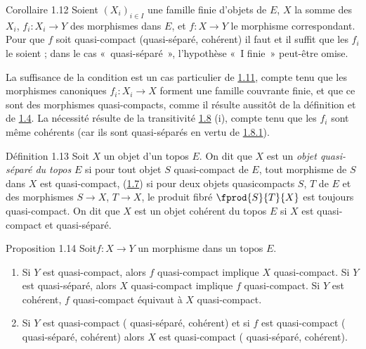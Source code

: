 \begin{enonce*}{Corollaire 1.12}
Soient $(X_i)_{i \in I}$ une famille finie d'objets de $E$, $X$ la
somme des $X_i$, $f_i : X_i \to Y$ des morphismes dans $E$, et $f : X
\to Y$ le morphisme correspondant. Pour que $f$ soit quasi-compact
(\resp quasi-séparé, \resp cohérent) il faut et il suffit que les
$f_i$ le soient ; dans le cas « quasi-séparé », l'hypothèse « I
finie » peut-être omise.
\end{enonce*}

La suffisance de la condition est un cas particulier de \hyperref[VI.cor1.11]{1.11}, compte
tenu que les morphismes canoniques $f_i : X_i \to X$ forment une
famille couvrante finie, et que ce sont des morphismes quasi-compacts,
comme il résulte aussitôt de la définition et de \hyperref[VI.cor1.4]{1.4}. La nécessité
résulte de la transitivité \hyperref[VI.prop1.8]{1.8} (i), compte tenu que les $f_i$ sont
même cohérents (car ils sont quasi-séparés en vertu de \hyperref[VI.cor1.8.1]{1.8.1}).

\begin{enonce*}{Définition 1.13}
Soit $X$ un objet d'un topos $E$. On dit que $X$ est un \emph{objet
quasi-séparé du topos} $E$ si pour tout objet $S$ quasi-compact
de $E$, tout morphisme de $S$ dans $X$ est quasi-compact, \ie (\hyperref[VI.def1.7]{1.7}) si
pour deux objets quasicompacts $S$, $T$ de $E$ et des morphismes $S
\to X$, $T \to X$, le produit fibré $\fprod{S}{T}{X}$ est toujours
quasi-compact. On dit que $X$ est un objet cohérent du topos $E$ si
$X$ est quasi-compact et quasi-séparé.
\end{enonce*}

\begin{enonce*}{Proposition 1.14}
Soit\pageoriginale $f : X \to Y$ un morphisme dans un topos $E$.
\begin{enumerate}
\renewcommand{\theenumi}{\roman{enumi}}
\renewcommand{\labelenumi}{(\theenumi)}
\item Si $Y$ est quasi-compact, alors $f$ quasi-compact implique $X$
  quasi-compact. Si $Y$ est quasi-séparé, alors $X$ quasi-compact
  implique $f$ quasi-compact. Si $Y$ est cohérent, $f$ quasi-compact
  équivaut à $X$ quasi-compact.

\item Si $Y$ est quasi-compact (\emph{\resp} quasi-séparé,
  \emph{\resp} cohérent) et
  si $f$ est quasi-compact (\emph{\resp} quasi-séparé,
\emph{\resp} cohérent) alors
  $X$ est quasi-compact (\emph{\resp} quasi-séparé, \emph{\resp} cohérent).
\end{enumerate}
\end{enonce*}

